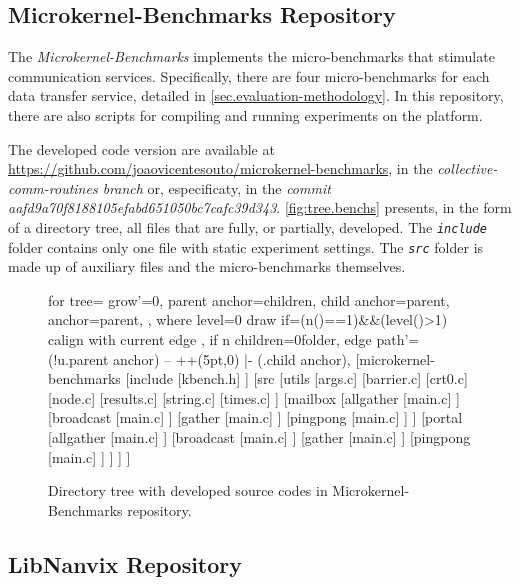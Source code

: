 	\subsection{Microkernel-Benchmarks Repository}

		The \textit{Microkernel-Benchmarks} implements the micro-benchmarks
		that stimulate communication services. Specifically, there are four
		micro-benchmarks for each data transfer service, detailed in
		\autoref{sec.evaluation-methodology}. In this repository, there
		are also scripts for compiling and running experiments on the
		\mppa platform.

		The developed code version are available at
		\url{https://github.com/joaovicentesouto/microkernel-benchmarks},
		in the \textit{collective-comm-routines branch} or, especificaty,
		in the \textit{commit aafd9a70f8188105efabd651050bc7cafc39d343}.
		\autoref{fig:tree.benchs} presents, in the form of a directory
		tree, all files that are fully, or partially, developed. The
		\textit{\texttt{include}} folder contains only one file with static
		experiment settings. The \textit{\texttt{src}} folder is made up of
		auxiliary files and the micro-benchmarks themselves.

		\begin{figure}[!ht]
			\centering%
			\caption{Directory tree with developed source codes in Microkernel-Benchmarks repository.}%
			\label{fig:tree.benchs}%
			\begin{forest}
			for tree={
				grow'=0,
				parent anchor=children,
				child anchor=parent,
				anchor=parent,
			},
			where level=0{
				draw
			}{
				if={(n()==1)&&(level()>1)}{
				calign with current edge
				}{},
				if n children=0{folder}{},
				edge path'={(!u.parent anchor) -- ++(5pt,0) |- (.child anchor)},
			}
			[microkernel-benchmarks
				[include
					[kbench.h]
				]
				[src
					[utils
						[args.c]
						[barrier.c]
						[crt0.c]
						[node.c]
						[results.c]
						[string.c]
						[times.c]
					]
					[mailbox
						[allgather
							[main.c]
						]
						[broadcast
							[main.c]
						]
						[gather
							[main.c]
						]
						[pingpong
							[main.c]
						]
					]
					[portal
						[allgather
							[main.c]
						]
						[broadcast
							[main.c]
						]
						[gather
							[main.c]
						]
						[pingpong
							[main.c]
						]
					]
				]
			]
			\end{forest}%
		\end{figure}

	\subsection{LibNanvix Repository}

